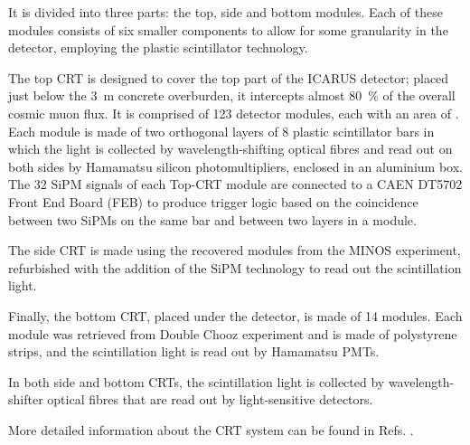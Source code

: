 It is divided into three parts: the top, side and bottom modules. Each of these modules consists of six smaller components to allow for some granularity in the detector, employing the plastic scintillator technology. 

The top CRT is designed to cover the top part of the ICARUS detector; placed just below the \SI{3}{\m} concrete overburden, it intercepts almost \SI{80}{\percent} of the overall cosmic muon flux. It is comprised of 123 detector modules, each with an area of . Each module is made of two orthogonal layers of 8 plastic scintillator bars in which the light is collected by wavelength-shifting optical fibres and read out on both sides by Hamamatsu silicon photomultipliers, enclosed in an aluminium box. The 32 SiPM signals of each Top-CRT module are connected to a CAEN DT5702 Front End  Board (FEB) to produce trigger logic based on  the coincidence between two SiPMs on the same bar and between two layers in a module. 

The side CRT is made using the recovered modules from the MINOS experiment, refurbished with the addition of the SiPM technology to read out the scintillation light.

Finally, the bottom CRT, placed under the detector, is made of 14 modules. Each module was retrieved from Double Chooz experiment and is made of polystyrene strips, and the scintillation light is read out by Hamamatsu PMTs. 

In both side and bottom CRTs, the scintillation light is collected by wavelength-shifter optical fibres that are read out by light-sensitive detectors. 

More detailed information about the CRT system can be found in Refs. \cite{ICARUS:2025rdw,Poppi:2023zmp,Poppi:2022vhg}. 